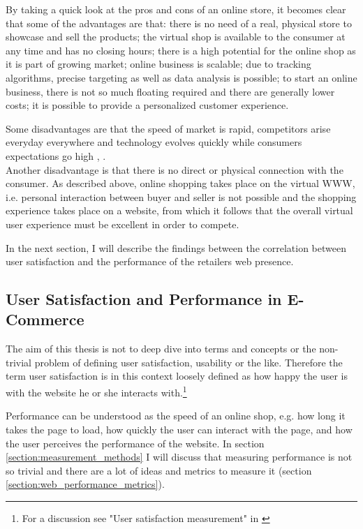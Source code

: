 By taking a quick look at the pros and cons of an online store, it becomes clear that some of the advantages are that: there is no need of a real, physical store to showcase and sell the products; the virtual shop is available to the consumer at any time and has no closing hours; there is a high potential for the online shop as it is part of growing market; online business is scalable; due to tracking algorithms, precise targeting as well as data analysis is possible; to start an online business, there is not so much floating required and there are generally lower costs; it is possible to provide a personalized customer experience.

Some disadvantages are that the speed of market is rapid, competitors arise everyday everywhere and technology evolves quickly while consumers expectations go high \cite{2019Hermogeno}, \cite{2020Lang}.
\\


Another disadvantage is that there is no direct or physical connection with the consumer.
As described above, online shopping takes place on the virtual WWW, i.e. personal interaction between buyer and seller is not possible and the shopping experience takes place on a website, from which it follows that the overall virtual user experience must be excellent in order to compete.

In the next section, I will describe the findings between the correlation between user satisfaction and the performance of the retailers web presence.




\subsection{User Satisfaction and Performance in E-Commerce} %
\label{chapter:user_satisfaction}


The aim of this thesis is not to deep dive into terms and concepts or the non-trivial problem of defining user satisfaction, usability or the like.
Therefore the term user satisfaction is in this context loosely defined as how happy the user is with the website he or she interacts with.\footnote{For a discussion see "User satisfaction measurement" in \cite{2010Islam}}


Performance can be understood as the speed of an online shop, e.g. how long it takes the page to load, how quickly the user can interact with the page, and how the user perceives the performance of the website.
In section \ref{section:measurement_methods} I will discuss that measuring performance is not so trivial and there are a lot of ideas and metrics to measure it (section \ref{section:web_performance_metrics}).


